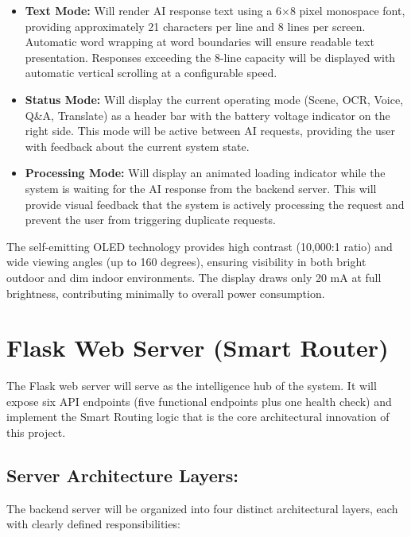 \begin{itemize}[leftmargin=1.5cm]
\item \textbf{Text Mode:} Will render AI response text using a 6$\times$8 pixel monospace font, providing approximately 21 characters per line and 8 lines per screen. Automatic word wrapping at word boundaries will ensure readable text presentation. Responses exceeding the 8-line capacity will be displayed with automatic vertical scrolling at a configurable speed.

\item \textbf{Status Mode:} Will display the current operating mode (Scene, OCR, Voice, Q\&A, Translate) as a header bar with the battery voltage indicator on the right side. This mode will be active between AI requests, providing the user with feedback about the current system state.

\item \textbf{Processing Mode:} Will display an animated loading indicator while the system is waiting for the AI response from the backend server. This will provide visual feedback that the system is actively processing the request and prevent the user from triggering duplicate requests.
\end{itemize}

The self-emitting OLED technology provides high contrast (10,000:1 ratio) and wide viewing angles (up to 160 degrees), ensuring visibility in both bright outdoor and dim indoor environments. The display draws only 20 mA at full brightness, contributing minimally to overall power consumption.

\section{Flask Web Server (Smart Router)}
The Flask web server will serve as the intelligence hub of the system. It will expose six API endpoints (five functional endpoints plus one health check) and implement the Smart Routing logic that is the core architectural innovation of this project.

\subsection*{Server Architecture Layers:}
The backend server will be organized into four distinct architectural layers, each with clearly defined responsibilities:


